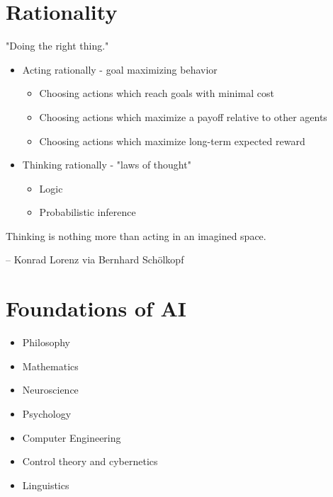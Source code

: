 \documentclass[11pt]{article}
\renewenvironment{quote}{\begin{shaded*}\begin{oldquote}}{\end{oldquote}\end{shaded*}}
\begin{document}
\section{Rationality}
\label{sec:orgb06beb4}

"Doing the right thing."

\begin{itemize}
\item Acting rationally - goal maximizing behavior

\begin{itemize}
\item Choosing actions which reach goals with minimal cost
\item Choosing actions which maximize a payoff relative to other agents
\item Choosing actions which maximize long-term expected reward
\end{itemize}

\item Thinking rationally - "laws of thought"

\begin{itemize}
\item Logic
\item Probabilistic inference
\end{itemize}
\end{itemize}


\begin{quote}
Thinking is nothing more than acting in an imagined space.
\end{quote}
\begin{quote}

\end{quote}
\begin{quote}
-- Konrad Lorenz via Bernhard Schölkopf
\end{quote}
\section{Foundations of AI}
\label{sec:org6d156c0}

\begin{itemize}
\item Philosophy
\item Mathematics
\item Neuroscience
\item Psychology
\item Computer Engineering
\item Control theory and cybernetics
\item Linguistics
\end{itemize}
\end{document}
